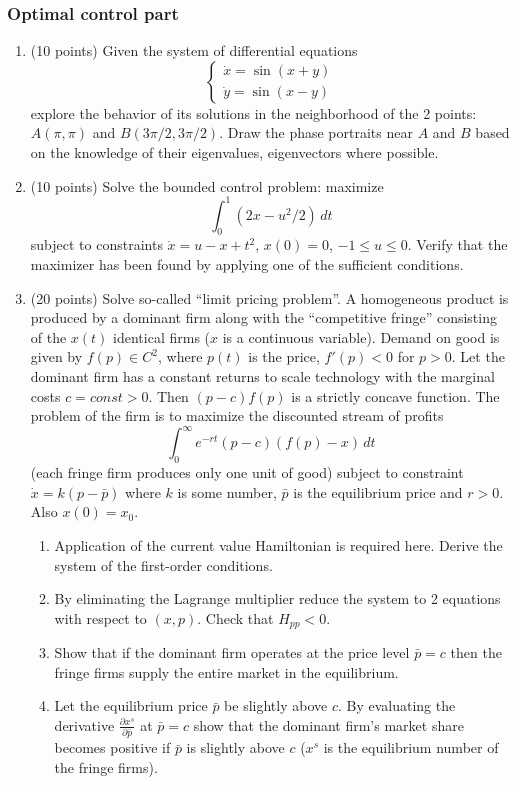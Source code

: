 \documentclass[12pt, a4paper]{article}
\begin{document}
\subsubsection*{Optimal control part}

\begin{enumerate}[resume]

\item	(10 points) Given the system of differential equations
\[
\begin{cases}
  \dot x = \sin (x + y) \\
  \dot y = \sin (x - y)
\end{cases}
\]
explore the behavior of its solutions in the neighborhood of the 2 points: $A(\pi, \pi)$ and $B(3\pi/2, 3\pi/2)$. Draw the phase portraits near $A$ and $B$ based on the knowledge of their eigenvalues, eigenvectors where possible.

\item	(10 points) Solve the bounded control problem: maximize
\[
\int_0^1(2x-u^2/2)\, dt
\]
subject to constraints $\dot x = u - x + t^2$, $x(0)=0$, $-1 \leq u \leq 0$. Verify that the maximizer has been found by applying one of the sufficient conditions.

\item	(20 points) Solve so-called “limit pricing problem”. A homogeneous product is produced by a dominant firm along with the “competitive fringe” consisting of the $x(t)$ identical firms ($x$ is a continuous variable). Demand on good is given by $f(p)\in C^2$, where $p(t)$ is the price, $f'(p)<0$ for $p>0$.
Let the dominant firm has a constant returns to scale technology with the marginal costs $c=const>0$. Then $(p-c)f(p)$ is a strictly concave function. The problem of the firm is to maximize the discounted stream of profits
\[
\int_0^{\infty}e^{-rt}(p-c)(f(p)-x)\, dt
\]
(each fringe firm produces only one unit of good) subject to constraint $\dot x = k(p-\bar p)$ where $k$ is some number, $\bar p$ is the equilibrium price and $r>0$. Also $x(0)=x_0$.
\begin{enumerate}
\item	Application of the current value Hamiltonian is required here. Derive the system of the first-order conditions.
\item	By eliminating the Lagrange multiplier reduce the system to 2 equations with respect to $(x,p)$. Check that  $H_{pp}<0$.
\item	Show that if the dominant firm operates at the price level $\bar p =c$ then the fringe firms supply the entire market in the equilibrium.
\item	Let the equilibrium price $\bar p$ be slightly above $c$. By evaluating the derivative $\frac{\partial x^s}{\partial \bar p}$  at $\bar p = c$ show that the dominant firm’s market share becomes positive if $\bar p$ is slightly above $c$ ($x^s$ is the equilibrium number of the fringe firms).
\end{enumerate}

\end{enumerate}
\end{document}
